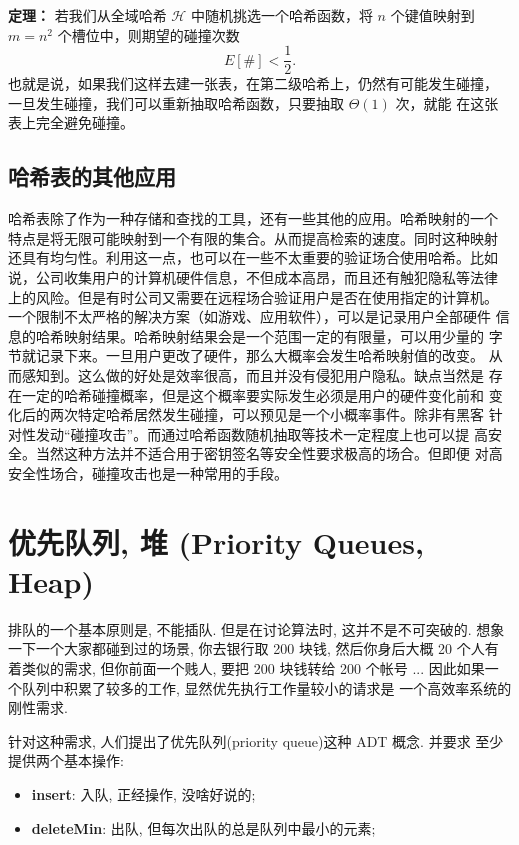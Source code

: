 \documentclass[a4paper]{ctexart}
\theoremstyle{definition}
\theoremstyle{definition}
\begin{document}
{\bf 定理：} 若我们从全域哈希 $\mathscr{H}$ 中随机挑选一个哈希函数，将
$n$ 个键值映射到 $m = n^2$ 个槽位中，则期望的碰撞次数
$$
E[\#] < \frac{1}{2}.
$$
也就是说，如果我们这样去建一张表，在第二级哈希上，仍然有可能发生碰撞，
一旦发生碰撞，我们可以重新抽取哈希函数，只要抽取 $\Theta(1)$ 次，就能
在这张表上完全避免碰撞。



\subsection{哈希表的其他应用}

哈希表除了作为一种存储和查找的工具，还有一些其他的应用。哈希映射的一个
特点是将无限可能映射到一个有限的集合。从而提高检索的速度。同时这种映射
还具有均匀性。利用这一点，也可以在一些不太重要的验证场合使用哈希。比如
说，公司收集用户的计算机硬件信息，不但成本高昂，而且还有触犯隐私等法律
上的风险。但是有时公司又需要在远程场合验证用户是否在使用指定的计算机。
一个限制不太严格的解决方案（如游戏、应用软件），可以是记录用户全部硬件
信息的哈希映射结果。哈希映射结果会是一个范围一定的有限量，可以用少量的
字节就记录下来。一旦用户更改了硬件，那么大概率会发生哈希映射值的改变。
从而感知到。这么做的好处是效率很高，而且并没有侵犯用户隐私。缺点当然是
存在一定的哈希碰撞概率，但是这个概率要实际发生必须是用户的硬件变化前和
变化后的两次特定哈希居然发生碰撞，可以预见是一个小概率事件。除非有黑客
针对性发动“碰撞攻击”。而通过哈希函数随机抽取等技术一定程度上也可以提
高安全。当然这种方法并不适合用于密钥签名等安全性要求极高的场合。但即便
对高安全性场合，碰撞攻击也是一种常用的手段。

\section{优先队列, 堆 (Priority Queues, Heap)}

排队的一个基本原则是, 不能插队. 但是在讨论算法时, 这并不是不可突破的.
想象一下一个大家都碰到过的场景, 你去银行取 200 块钱, 然后你身后大概 20
个人有着类似的需求, 但你前面一个贱人, 要把 200 块钱转给 200 个帐号
... 因此如果一个队列中积累了较多的工作, 显然优先执行工作量较小的请求是
一个高效率系统的刚性需求.

针对这种需求, 人们提出了优先队列(priority queue)这种 ADT 概念. 并要求
至少提供两个基本操作:

\begin{itemize}
\item {\bf insert}: 入队, 正经操作, 没啥好说的;
\item {\bf deleteMin}: 出队, 但每次出队的总是队列中最小的元素; 
\end{itemize}
\end{document}
